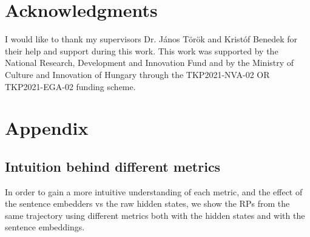 \documentclass[a4paper,12pt]{article}
\begin{document}

\section{Acknowledgments }
\label{sec:acknowledgements}

I would like to thank my supervisors Dr. János Török and Kristóf Benedek for their help and support during this work. This work was supported by the National Research, Development and Innovation Fund and by the Ministry of Culture and Innovation of Hungary through the TKP2021-NVA-02 OR TKP2021-EGA-02 funding scheme.

\newpage
\printbibliography


\section{Appendix}
\label{sec:appendix}

\subsection{Intuition behind different metrics}
\label{subsec:appendix_intuition_metrics}

In order to gain a more intuitive understanding of each metric, and the effect of the sentence embedders vs the raw hidden states, we show the RPs from the same trajectory using different metrics both with the hidden states and with the sentence embeddings.
\end{document}
